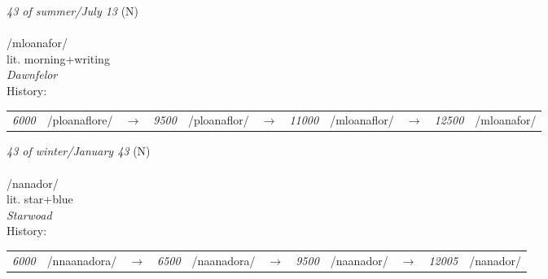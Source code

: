 \vspace{15pt}
\begin{nopagebreak}
 \textit{43 of summer/July 13} (N)\\
\\
\noindent /mloan{\textprimstress}afor/\\
\noindent lit. morning+writing\\
\noindent \textit{Dawnfelor}\\


\noindent History:

\vspace{-0pt}
\hspace{40pt}
\begin{tabular}{ccc}
\textit{6000} & /ploanaflore/&$\rightarrow$ & \textit{9500} & /ploanaflor/&$\rightarrow$ & \textit{11000} & /mloanaflor/&$\rightarrow$ & \textit{12500} & /mloanafor/& \\
\end{tabular}

\vspace{20pt}\hline

\end{nopagebreak}
\filbreak



\vspace{15pt}
\begin{nopagebreak}
 \textit{43 of winter/January 43} (N)\\
\\
\noindent /nan{\textprimstress}ador/\\
\noindent lit. star+blue\\
\noindent \textit{Starwoad}\\


\noindent History:

\vspace{-0pt}
\hspace{40pt}
\begin{tabular}{ccc}
\textit{6000} & /nnaanadora/&$\rightarrow$ & \textit{6500} & /naanadora/&$\rightarrow$ & \textit{9500} & /naanador/&$\rightarrow$ & \textit{12005} & /nanador/& \\
\end{tabular}

\vspace{20pt}\hline

\end{nopagebreak}
\filbreak



